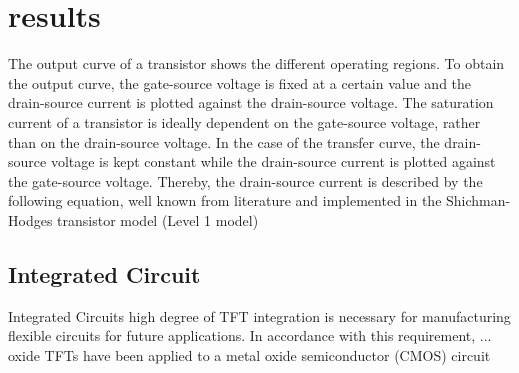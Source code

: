 \chapter{results}
\label{result}
The output curve of a transistor shows the different operating regions.
To obtain the output curve, the gate-source voltage is fixed at a certain value and the
drain-source current is plotted against the drain-source voltage. The saturation current
of a transistor is ideally dependent on the gate-source voltage, rather than on the drain-source voltage. In the case of the transfer curve, the drain-source voltage
is kept constant while the drain-source current is plotted against the gate-source voltage. Thereby, the drain-source current is described by the following equation, well known from literature and implemented in the Shichman-Hodges transistor model (Level 1
model)


\section{Integrated Circuit}
 Integrated Circuits high degree of TFT integration is necessary for manufacturing flexible circuits for future applications. In accordance with this requirement,  ... oxide  TFTs  have  been  applied  to  a    metal  oxide  semiconductor  (CMOS)  circuit
 
